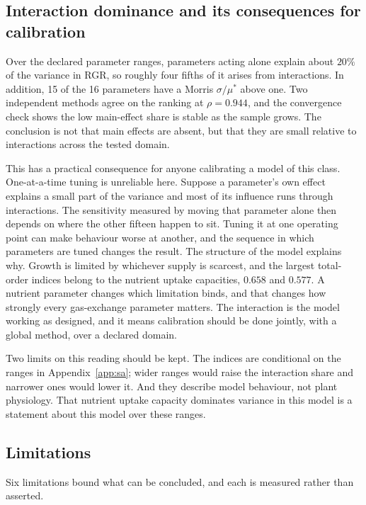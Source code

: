 \subsection{Interaction dominance and its consequences for calibration}

Over the declared parameter ranges, parameters acting alone explain about
$20\%$ of the variance in RGR, so roughly four fifths of it arises from
interactions. In addition, 15 of the 16 parameters have a Morris
$\sigma/\mu^{*}$ above one. Two independent methods
agree on the ranking at $\rho = 0.944$, and the convergence check shows the low
main-effect share is stable as the sample grows. The
conclusion is not that main effects are absent, but that they are small
relative to interactions across the tested domain.

This has a practical consequence for anyone calibrating a model of this class.
One-at-a-time tuning is unreliable here. Suppose a parameter's own effect explains a small part of the variance and most
of its influence runs through interactions. The sensitivity measured by moving that
parameter alone then depends on where the other fifteen happen to sit. Tuning it at one operating point can make behaviour
worse at another, and the sequence in which parameters are tuned changes the
result. The structure of the model explains why. Growth is limited by whichever
supply is scarcest, and the largest total-order indices belong to the nutrient
uptake capacities, $0.658$ and $0.577$. A nutrient parameter changes which
limitation binds, and that changes how strongly every gas-exchange parameter
matters. The interaction is the model working as designed, and it means
calibration should be done jointly, with a global method, over a declared
domain.

Two limits on this reading should be kept. The indices are conditional on the
ranges in Appendix~\ref{app:sa}; wider ranges would raise the interaction share
and narrower ones would lower it. And they describe model behaviour, not plant
physiology. That nutrient uptake capacity dominates variance in this model is a
statement about this model over these ranges.

\subsection{Limitations}
\label{sec:limitations}

Six limitations bound what can be concluded, and each is measured rather than
asserted.

